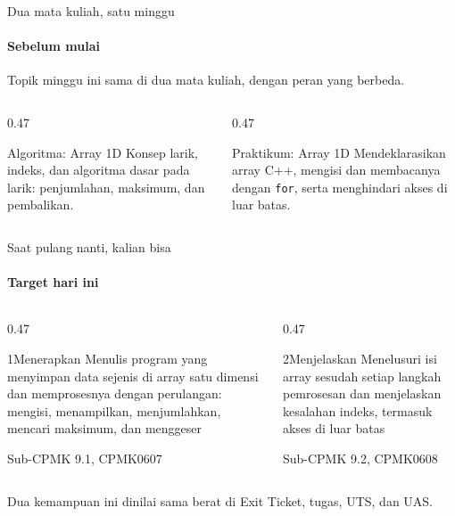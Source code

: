 \documentclass[t]{beamer}
\begin{document}

\begin{frame}{Dua mata kuliah, satu minggu}
\framesubtitle{Sebelum mulai}
Topik minggu ini sama di dua mata kuliah, dengan peran yang berbeda.
\vspace{10pt}

\begin{columns}[T]
\begin{column}{0.47\textwidth}
\begin{Blok}{Algoritma: Array 1D}
Konsep larik, indeks, dan algoritma dasar pada larik: penjumlahan, maksimum, dan pembalikan.
\end{Blok}
\end{column}
\begin{column}{0.47\textwidth}
\begin{BlokGelap}{Praktikum: Array 1D}
Mendeklarasikan array C++, mengisi dan membacanya dengan \texttt{for}, serta menghindari akses di luar batas.
\end{BlokGelap}
\end{column}
\end{columns}
\end{frame}

\begin{frame}{Saat pulang nanti, kalian bisa}
\framesubtitle{Target hari ini}
\begin{columns}[T]
\begin{column}{0.47\textwidth}
\begin{Langkah}{1}{Menerapkan}
Menulis program yang menyimpan data sejenis di array satu dimensi dan memprosesnya dengan perulangan: mengisi, menampilkan, menjumlahkan, mencari maksimum, dan menggeser

{\footnotesize\color{ITERAInkMuted}Sub-CPMK 9.1, CPMK0607}
\end{Langkah}
\end{column}
\begin{column}{0.47\textwidth}
\begin{Langkah}{2}{Menjelaskan}
Menelusuri isi array sesudah setiap langkah pemrosesan dan menjelaskan kesalahan indeks, termasuk akses di luar batas

{\footnotesize\color{ITERAInkMuted}Sub-CPMK 9.2, CPMK0608}
\end{Langkah}
\end{column}
\end{columns}
\vspace{8pt}
\begin{Catatan}
Dua kemampuan ini dinilai sama berat di Exit Ticket, tugas, UTS, dan UAS.
\end{Catatan}
\end{frame}
\end{document}
